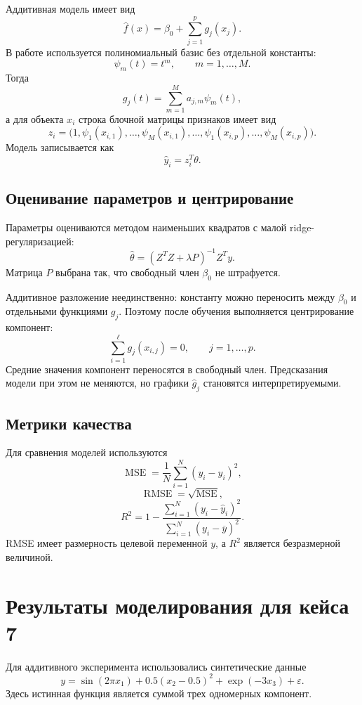 \documentclass[12pt,a4paper]{article}
\newcommand{\eps}{\varepsilon}
\begin{document}
Аддитивная модель имеет вид
\[
    \widehat f(x)
    =
    \beta_0+\sum\limits_{j=1}^{p}g_j(x_j).
\]
В работе используется полиномиальный базис без отдельной константы:
\[
    \psi_m(t)=t^m,\qquad m=1,\ldots,M.
\]
Тогда
\[
    g_j(t)=\sum\limits_{m=1}^{M}a_{j,m}\psi_m(t),
\]
а для объекта \(x_i\) строка блочной матрицы признаков имеет вид
\[
    z_i=
    \bigl(
    1,\psi_1(x_{i,1}),\ldots,\psi_M(x_{i,1}),
    \ldots,
    \psi_1(x_{i,p}),\ldots,\psi_M(x_{i,p})
    \bigr).
\]
Модель записывается как
\[
    \widehat y_i=z_i^{T}\theta.
\]

\subsection{Оценивание параметров и центрирование}

Параметры оцениваются методом наименьших квадратов с малой
ridge-регуляризацией:
\[
    \widehat\theta
    =
    (Z^{T}Z+\lambda P)^{-1}Z^{T}y.
\]
Матрица \(P\) выбрана так, что свободный член \(\beta_0\) не штрафуется.

Аддитивное разложение неединственно: константу можно переносить между
\(\beta_0\) и отдельными функциями \(g_j\). Поэтому после обучения выполняется
центрирование компонент:
\[
    \sum\limits_{i=1}^{\ell}g_j(x_{i,j})=0,
    \qquad j=1,\ldots,p.
\]
Средние значения компонент переносятся в свободный член. Предсказания модели
при этом не меняются, но графики \(\widehat g_j\) становятся интерпретируемыми.

\subsection{Метрики качества}

Для сравнения моделей используются
\[
    \operatorname{MSE}
    =
    \frac{1}{N}\sum\limits_{i=1}^{N}(y_i-\widehat y_i)^2,
\]
\[
    \operatorname{RMSE}=\sqrt{\operatorname{MSE}},
\]
\[
    R^2
    =
    1-
    \frac{\sum\limits_{i=1}^{N}(y_i-\widehat y_i)^2}
    {\sum\limits_{i=1}^{N}(y_i-\overline y)^2}.
\]
RMSE имеет размерность целевой переменной \(y\), а \(R^2\) является
безразмерной величиной.

\section{Результаты моделирования для кейса 7}

Для аддитивного эксперимента использовались синтетические данные
\[
    y
    =
    \sin(2\pi x_1)
    +0.5(x_2-0.5)^2
    +\exp(-3x_3)
    +\eps.
\]
Здесь истинная функция является суммой трех одномерных компонент.
\end{document}
